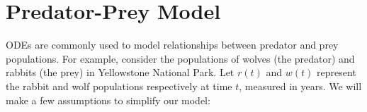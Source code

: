 \label{lab:predator-prey}



\section*{Predator-Prey Model} 
ODEs are commonly used to model relationships between predator and prey populations. For example, consider the populations of wolves (the predator) and rabbits (the prey) in Yellowstone National Park. 
Let $r(t)$ and $w(t)$ represent the rabbit and wolf populations respectively at time $t$, measured in years. 
We will make a few assumptions to simplify our model:

